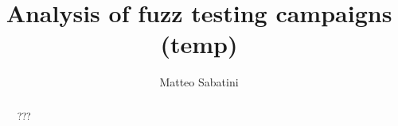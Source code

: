 \documentclass[Lau, oneside]{sapthesis}%
\title{Analysis of fuzz testing campaigns (temp)}
\author{Matteo Sabatini}
\begin{document}
\setlength{\parindent}{0pt}    %
\frontmatter
\maketitle

\begin{abstract}
???
\newline \newline
\end{abstract}




\tableofcontents


\titleformat{\chapter}[display]  
{\normalfont\Huge\bfseries}{\chaptertitlename\ \thechapter}{20pt}{\huge}  
\titlespacing{\chapter}{0pt}{0pt}{0pt}  

\mainmatter
\end{document}
